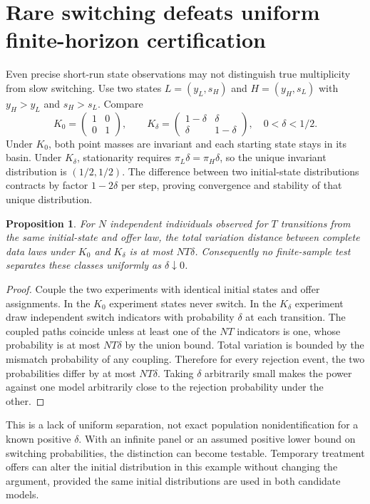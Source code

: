 \documentclass[11pt,a4paper]{article}
\newtheorem{proposition}[theorem]{Proposition}
\begin{document}
\section{Rare switching defeats uniform finite-horizon certification}
Even precise short-run state observations may not distinguish true multiplicity from slow switching. Use two states $L=(y_L,s_H)$ and $H=(y_H,s_L)$ with $y_H>y_L$ and $s_H>s_L$. Compare
\[
 K_0=\begin{pmatrix}1&0\\0&1\end{pmatrix},\qquad
 K_\delta=\begin{pmatrix}1-\delta&\delta\\\delta&1-\delta\end{pmatrix},
 \quad0<\delta<1/2.
\]
Under $K_0$, both point masses are invariant and each starting state stays in its basin. Under $K_\delta$, stationarity requires $\pi_L\delta=\pi_H\delta$, so the unique invariant distribution is $(1/2,1/2)$. The difference between two initial-state distributions contracts by factor $1-2\delta$ per step, proving convergence and stability of that unique distribution.
\begin{proposition}
For $N$ independent individuals observed for $T$ transitions from the same initial-state and offer law, the total variation distance between complete data laws under $K_0$ and $K_\delta$ is at most $NT\delta$. Consequently no finite-sample test separates these classes uniformly as $\delta\downarrow0$.
\end{proposition}
\begin{proof}
Couple the two experiments with identical initial states and offer assignments. In the $K_0$ experiment states never switch. In the $K_\delta$ experiment draw independent switch indicators with probability $\delta$ at each transition. The coupled paths coincide unless at least one of the $NT$ indicators is one, whose probability is at most $NT\delta$ by the union bound. Total variation is bounded by the mismatch probability of any coupling. Therefore for every rejection event, the two probabilities differ by at most $NT\delta$. Taking $\delta$ arbitrarily small makes the power against one model arbitrarily close to the rejection probability under the other.
\end{proof}
This is a lack of uniform separation, not exact population nonidentification for a known positive $\delta$. With an infinite panel or an assumed positive lower bound on switching probabilities, the distinction can become testable. Temporary treatment offers can alter the initial distribution in this example without changing the argument, provided the same initial distributions are used in both candidate models.
\end{document}
